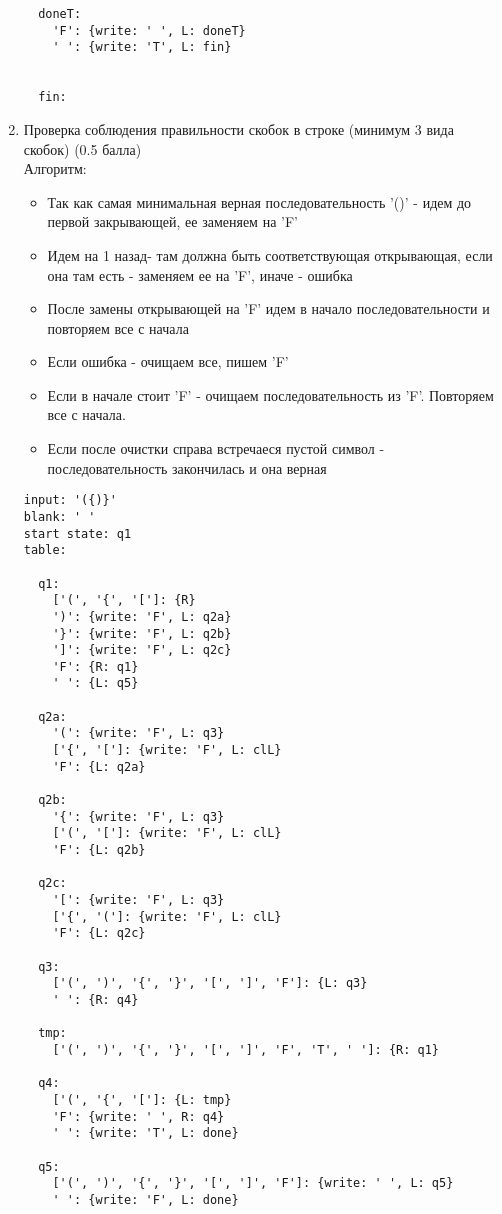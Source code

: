 \documentclass[a4paper]{article}
\begin{document}
\begin{enumerate}
\begin{verbatim}
  doneT:
    'F': {write: ' ', L: doneT}
    ' ': {write: 'T', L: fin}
  
  
  fin:
        \end{verbatim}



    \item Проверка соблюдения правильности скобок в строке (минимум 3 вида скобок) (0.5 балла) \\
		Алгоритм:
		\begin{itemize}
			\item Так как самая минимальная верная последовательность '()' - идем до первой закрывающей, ее заменяем на 'F'
			\item Идем на 1 назад- там должна быть соответствующая открывающая, если она там есть - заменяем ее на 'F', иначе - ошибка
			\item После замены открывающей на 'F' идем в начало последовательности и повторяем все с начала
			\item Если ошибка - очищаем все, пишем 'F'
			\item Если в начале стоит 'F' - очищаем последовательность из 'F'. Повторяем все с начала.
			\item Если после очистки справа встречаеся пустой символ - последовательность закончилась и она верная
		\end{itemize}

\begin{verbatim}
input: '({)}'
blank: ' '
start state: q1
table:
  
  q1:
    ['(', '{', '[']: {R}
    ')': {write: 'F', L: q2a}
    '}': {write: 'F', L: q2b}
    ']': {write: 'F', L: q2c}
    'F': {R: q1}
    ' ': {L: q5}
  
  q2a:
    '(': {write: 'F', L: q3}
    ['{', '[']: {write: 'F', L: clL}
    'F': {L: q2a}
  
  q2b:
    '{': {write: 'F', L: q3}
    ['(', '[']: {write: 'F', L: clL}
    'F': {L: q2b}
  
  q2c:
    '[': {write: 'F', L: q3}
    ['{', '(']: {write: 'F', L: clL}
    'F': {L: q2c}
    
  q3:
    ['(', ')', '{', '}', '[', ']', 'F']: {L: q3}
    ' ': {R: q4}
  
  tmp:
    ['(', ')', '{', '}', '[', ']', 'F', 'T', ' ']: {R: q1}
   
  q4:
    ['(', '{', '[']: {L: tmp}
    'F': {write: ' ', R: q4}
    ' ': {write: 'T', L: done}
    
  q5:
    ['(', ')', '{', '}', '[', ']', 'F']: {write: ' ', L: q5}
    ' ': {write: 'F', L: done}
  

\end{verbatim}
\end{enumerate}
\end{document}
